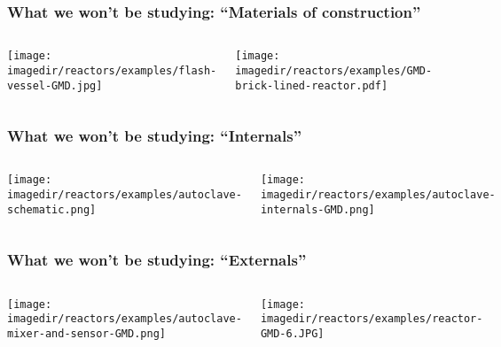 \begin{frame}\frametitle{What we won't be studying: ``Materials of construction''}
	\begin{columns}[t]
			\begin{center}
				\texttt{[image: \\imagedir/reactors/examples/flash-vessel-GMD.jpg]}
			\end{center}
			\begin{center}
				\texttt{[image: \\imagedir/reactors/examples/GMD-brick-lined-reactor.pdf]}
			\end{center}
	\end{columns}
\end{frame}

\begin{frame}\frametitle{What we won't be studying: ``Internals''}
	\begin{columns}[t]
			\begin{center}
				\texttt{[image: \\imagedir/reactors/examples/autoclave-schematic.png]}
			\end{center}
			\begin{center}
				\texttt{[image: \\imagedir/reactors/examples/autoclave-internals-GMD.png]}
			\end{center}
	\end{columns}
\end{frame}

\begin{frame}\frametitle{What we won't be studying: ``Externals''}
	\begin{columns}[t]
			\begin{center}
				\texttt{[image: \\imagedir/reactors/examples/autoclave-mixer-and-sensor-GMD.png]}
			\end{center}
			\begin{center}
				\texttt{[image: \\imagedir/reactors/examples/reactor-GMD-6.JPG]}
			\end{center}
	\end{columns}
\end{frame}

